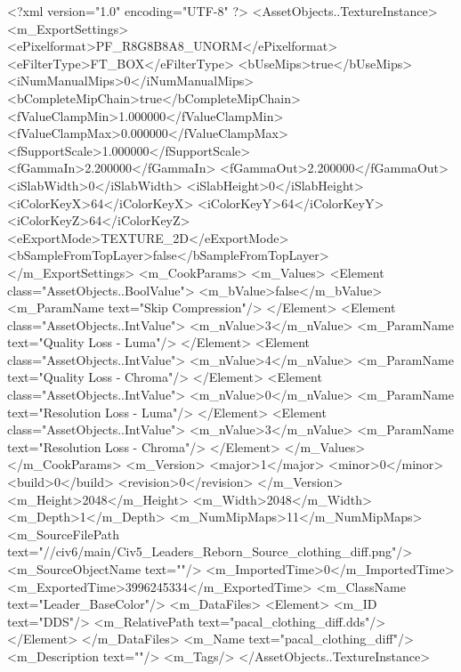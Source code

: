 <?xml version="1.0" encoding="UTF-8" ?>
<AssetObjects..TextureInstance>
	<m_ExportSettings>
		<ePixelformat>PF_R8G8B8A8_UNORM</ePixelformat>
		<eFilterType>FT_BOX</eFilterType>
		<bUseMips>true</bUseMips>
		<iNumManualMips>0</iNumManualMips>
		<bCompleteMipChain>true</bCompleteMipChain>
		<fValueClampMin>1.000000</fValueClampMin>
		<fValueClampMax>0.000000</fValueClampMax>
		<fSupportScale>1.000000</fSupportScale>
		<fGammaIn>2.200000</fGammaIn>
		<fGammaOut>2.200000</fGammaOut>
		<iSlabWidth>0</iSlabWidth>
		<iSlabHeight>0</iSlabHeight>
		<iColorKeyX>64</iColorKeyX>
		<iColorKeyY>64</iColorKeyY>
		<iColorKeyZ>64</iColorKeyZ>
		<eExportMode>TEXTURE_2D</eExportMode>
		<bSampleFromTopLayer>false</bSampleFromTopLayer>
	</m_ExportSettings>
	<m_CookParams>
		<m_Values>
			<Element class="AssetObjects..BoolValue">
				<m_bValue>false</m_bValue>
				<m_ParamName text="Skip Compression"/>
			</Element>
			<Element class="AssetObjects..IntValue">
				<m_nValue>3</m_nValue>
				<m_ParamName text="Quality Loss - Luma"/>
			</Element>
			<Element class="AssetObjects..IntValue">
				<m_nValue>4</m_nValue>
				<m_ParamName text="Quality Loss - Chroma"/>
			</Element>
			<Element class="AssetObjects..IntValue">
				<m_nValue>0</m_nValue>
				<m_ParamName text="Resolution Loss - Luma"/>
			</Element>
			<Element class="AssetObjects..IntValue">
				<m_nValue>3</m_nValue>
				<m_ParamName text="Resolution Loss - Chroma"/>
			</Element>
		</m_Values>
	</m_CookParams>
	<m_Version>
		<major>1</major>
		<minor>0</minor>
		<build>0</build>
		<revision>0</revision>
	</m_Version>
	<m_Height>2048</m_Height>
	<m_Width>2048</m_Width>
	<m_Depth>1</m_Depth>
	<m_NumMipMaps>11</m_NumMipMaps>
	<m_SourceFilePath text="//civ6/main/Civ5_Leaders_Reborn\Texture_Source\Pacal\pacal_clothing_diff.png"/>
	<m_SourceObjectName text=""/>
	<m_ImportedTime>0</m_ImportedTime>
	<m_ExportedTime>3996245334</m_ExportedTime>
	<m_ClassName text="Leader_BaseColor"/>
	<m_DataFiles>
		<Element>
			<m_ID text="DDS"/>
			<m_RelativePath text="pacal_clothing_diff.dds"/>
		</Element>
	</m_DataFiles>
	<m_Name text="pacal_clothing_diff"/>
	<m_Description text=""/>
	<m_Tags/>
</AssetObjects..TextureInstance>

